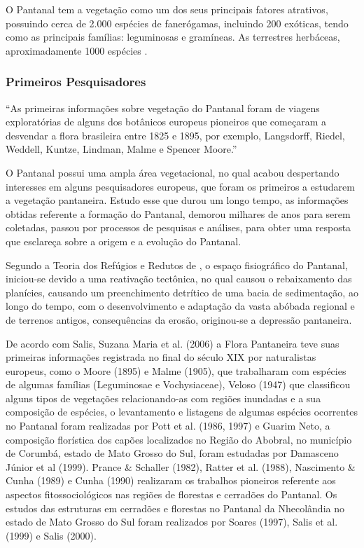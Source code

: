 		O Pantanal tem a vegetação como um dos seus principais fatores atrativos, possuindo cerca de 2.000 espécies de fanerógamas, incluindo 200 exóticas, tendo como as principais famílias: leguminosas e gramíneas. As terrestres herbáceas, aproximadamente 1000 espécies \cite{pott2009vegetaccao}.
		
			
		\subsubsection{Primeiros Pesquisadores}
	
			\begin{citacao}
				“As primeiras informações sobre vegetação do Pantanal foram de viagens exploratórias de alguns dos botânicos europeus pioneiros que começaram a desvendar a flora brasileira entre 1825 e 1895, por exemplo, Langsdorff, Riedel, Weddell, Kuntze, Lindman, Malme e Spencer Moore.”\cite{pott2009vegetaccao}
			\end{citacao}
		
		
			O Pantanal possui uma ampla área vegetacional, no qual acabou despertando interesses em alguns pesquisadores europeus, que foram os primeiros a estudarem a vegetação pantaneira. Estudo esse que durou um longo tempo, as informações obtidas referente a formação do Pantanal, demorou milhares de anos para serem coletadas, passou por processos de pesquisas e análises, para obter  uma resposta que esclareça sobre a origem e a evolução do Pantanal. 
			
			Segundo a Teoria dos Refúgios e Redutos de , o espaço fisiográfico do Pantanal, iniciou-se devido a uma reativação tectônica, no qual causou o rebaixamento das planícies, causando um preenchimento detrítico de uma bacia de sedimentação,  ao longo do tempo, com o desenvolvimento e adaptação da vasta abóbada regional e de terrenos antigos, consequências da erosão, originou-se a depressão pantaneira.
					
			De acordo com Salis, Suzana Maria et al. (2006) a Flora Pantaneira teve suas primeiras informações registrada no final do século XIX por naturalistas europeus, como o Moore (1895) e Malme (1905), que trabalharam com espécies de algumas famílias (Leguminosae e Vochysiaceae), Veloso (1947) que classificou alguns tipos de vegetações relacionando-as com regiões inundadas e a sua composição de espécies, o levantamento e listagens de algumas espécies ocorrentes no Pantanal foram realizadas por Pott et al. (1986, 1997) e Guarim Neto, a composição florística dos capões localizados no Região do Abobral, no município de Corumbá, estado de Mato Grosso do Sul, foram estudadas por Damasceno Júnior et al (1999). Prance \& Schaller (1982), Ratter et al. (1988), Nascimento \& Cunha (1989) e Cunha (1990) realizaram os trabalhos pioneiros referente aos aspectos fitossociológicos nas regiões de florestas e cerradões do Pantanal. Os estudos das estruturas em cerradões e florestas no Pantanal da Nhecolândia no estado de Mato Grosso do Sul foram realizados por Soares (1997), Salis et al. (1999) e Salis (2000).
		
